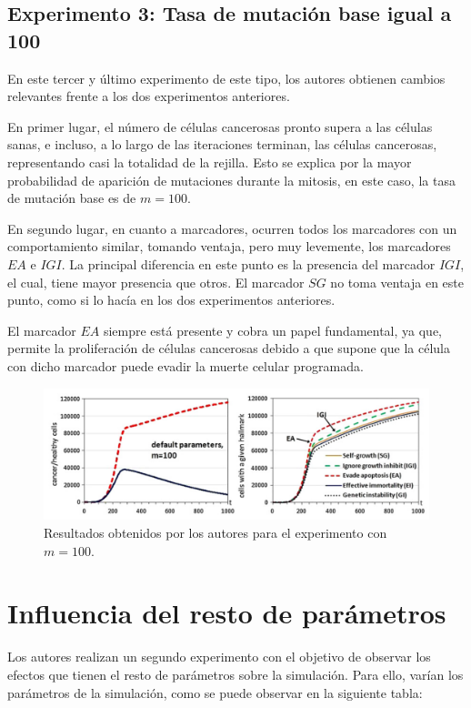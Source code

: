 \subsection{Experimento 3: Tasa de mutación base igual a 100}

En este tercer y último experimento de este tipo, los autores obtienen cambios relevantes frente a los dos
experimentos anteriores.

En primer lugar, el número de células cancerosas pronto supera a las células sanas, e incluso,
a lo largo de las iteraciones terminan, las células cancerosas, representando casi la totalidad de
la rejilla. Esto se explica por la mayor probabilidad de aparición de mutaciones durante la mitosis, en
este caso, la tasa de mutación base es de $m=100$.

En segundo lugar, en cuanto a marcadores, ocurren todos los marcadores con un comportamiento similar,
tomando ventaja, pero muy levemente, los marcadores $EA$ e $IGI$. La principal diferencia en este punto es
la presencia del marcador $IGI$, el cual, tiene mayor presencia que otros. El marcador $SG$ no toma ventaja en
este punto, como si lo hacía en los dos experimentos anteriores.

El marcador $EA$ siempre está presente y cobra un papel fundamental, ya que, permite la proliferación
de células cancerosas debido a que supone que la célula con dicho marcador puede evadir la muerte
celular programada.

\begin{figure}[h]
\centering
\includegraphics[scale=0.6]{figures/experiments/exp3}
\caption{Resultados obtenidos por los autores para el experimento con $m=100$.}
\end{figure}

\section{Influencia del resto de parámetros}

Los autores realizan un segundo experimento con el objetivo de observar los efectos
que tienen el resto de parámetros sobre la simulación. Para ello, varían los parámetros de
la simulación, como se puede observar en la siguiente tabla:


